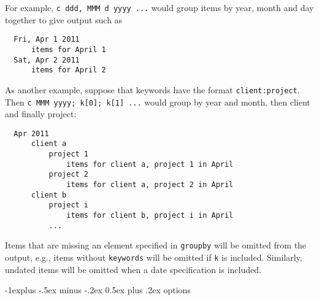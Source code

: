 \documentclass[9pt,landscape]{article}
\makeatletter
\renewcommand{\subsection}{\@startsection{subsection}{2}{0mm}%
                                {-1explus -.5ex minus -.2ex}%
                                {0.5ex plus .2ex}%
                                {\normalfont\normalsize\bfseries}}
\makeatother
\begin{document}
\begin{multicols}{3}
\vskip3pt
For example, \verb!c ddd, MMM d yyyy ...! would group items by year, month and day together to give output such as
\begin{verbatim}
  Fri, Apr 1 2011
      items for April 1
  Sat, Apr 2 2011
      items for April 2
\end{verbatim}

As another example, suppose that keywords have the format \verb!client:project!. Then \verb!c MMM yyyy; k[0]; k[1] ...! would group by year and month, then client and finally project:

\begin{verbatim}
  Apr 2011
      client a
          project 1
              items for client a, project 1 in April
          project 2
              items for client a, project 2 in April
      client b
          project i
              items for client b, project i in April
          ...
\end{verbatim}

Items that are missing an element specified in \verb'groupby' will be omitted from the output, e.g., items without \verb'keywords' will be omitted if \verb'k' is included. Similarly, undated items will be omitted when a date specification is included.


\subsection{options}


\end{multicols}
\end{document}
